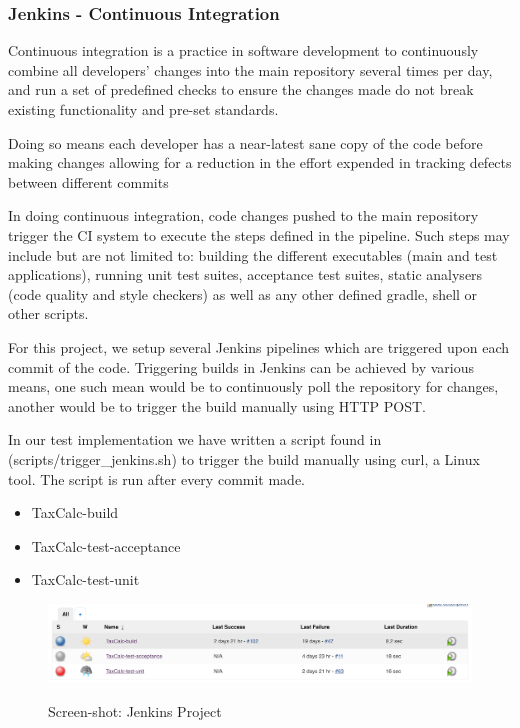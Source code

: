 \subsubsection{Jenkins - Continuous Integration}
Continuous integration is a practice in software development to continuously combine all developers’ changes into the main repository several times per day, and run a set of predefined checks to ensure the changes made do not break existing functionality and pre-set standards. 
\par
Doing so means each developer has a near-latest sane copy of the code before making changes allowing for a reduction in the effort expended in tracking defects between different commits  
\par
In doing continuous integration, code changes pushed to the main repository  trigger the CI system to execute the steps defined in the pipeline.
Such steps may include but are not limited to: building the different executables (main and test applications), running unit test suites, acceptance test suites, static analysers (code quality and style checkers) as well as any other defined gradle, shell or other scripts.  
\par
For this project, we setup several Jenkins pipelines which are triggered upon each commit of the code. 
Triggering builds in Jenkins can be achieved by various means, one such mean would be to continuously poll the repository for changes, 
another would be to trigger the build manually using HTTP POST. 
\par
In our test implementation we have written a script found in (scripts/trigger\_jenkins.sh) to trigger the build manually using curl, a Linux tool. The script is run after every commit made. 
\begin{itemize}
    \item TaxCalc-build
	\item TaxCalc-test-acceptance
	\item TaxCalc-test-unit
\end{itemize}

\begin{figure}[H]
\includegraphics[scale=0.4]{res/jenkins.png}
\label{fig:jenkins-screenshot}
\caption{Screen-shot: Jenkins Project}
\end{figure}